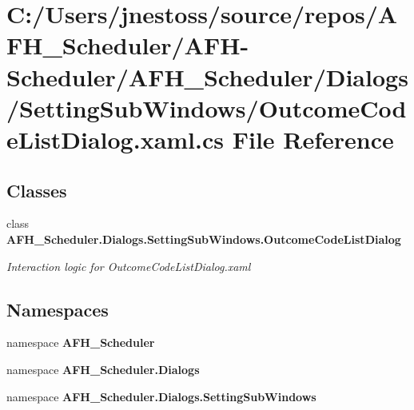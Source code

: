 \section{C\+:/\+Users/jnestoss/source/repos/\+A\+F\+H\+\_\+\+Scheduler/\+A\+F\+H-\/\+Scheduler/\+A\+F\+H\+\_\+\+Scheduler/\+Dialogs/\+Setting\+Sub\+Windows/\+Outcome\+Code\+List\+Dialog.xaml.\+cs File Reference}
\label{_outcome_code_list_dialog_8xaml_8cs}
\subsection*{Classes}
\begin{DoxyCompactItemize}
\item 
class \textbf{ A\+F\+H\+\_\+\+Scheduler.\+Dialogs.\+Setting\+Sub\+Windows.\+Outcome\+Code\+List\+Dialog}
\begin{DoxyCompactList}\small\item\em Interaction logic for Outcome\+Code\+List\+Dialog.\+xaml \end{DoxyCompactList}\end{DoxyCompactItemize}
\subsection*{Namespaces}
\begin{DoxyCompactItemize}
\item 
namespace \textbf{ A\+F\+H\+\_\+\+Scheduler}
\item 
namespace \textbf{ A\+F\+H\+\_\+\+Scheduler.\+Dialogs}
\item 
namespace \textbf{ A\+F\+H\+\_\+\+Scheduler.\+Dialogs.\+Setting\+Sub\+Windows}
\end{DoxyCompactItemize}
